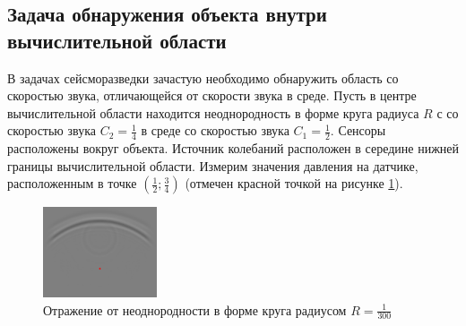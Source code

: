 \documentclass[a4paper, fontsize=14pt]{article}
\begin{document}
\subsection{Задача обнаружения объекта внутри вычислительной области}
В задачах сейсморазведки зачастую необходимо обнаружить область со скоростью звука, отличающейся от
скорости звука в среде. Пусть в центре вычислительной области находится неоднородность в форме круга радиуса $R$ 
с со
скоростью звука $C_2 = \frac{1}{4}$ в среде со скоростью звука $C_1 = \frac{1}{2}$. Сенсоры
расположены вокруг объекта. Источник колебаний расположен в середине нижней границы вычислительной области.
Измерим значения давления на датчике, расположенным в точке $\left(\frac{1}{2};\frac{3}{4}\right)$
(отмечен красной точкой на рисунке \ref{detector}).
\begin{figure}[b]
	\centering
	\includegraphics[width=0.3\textwidth]{detector.eps}
	\caption{Отражение от неоднородности в форме круга радиусом $R=\frac{1}{300}$}
	\label{detector}
\end{figure}
\end{document}
